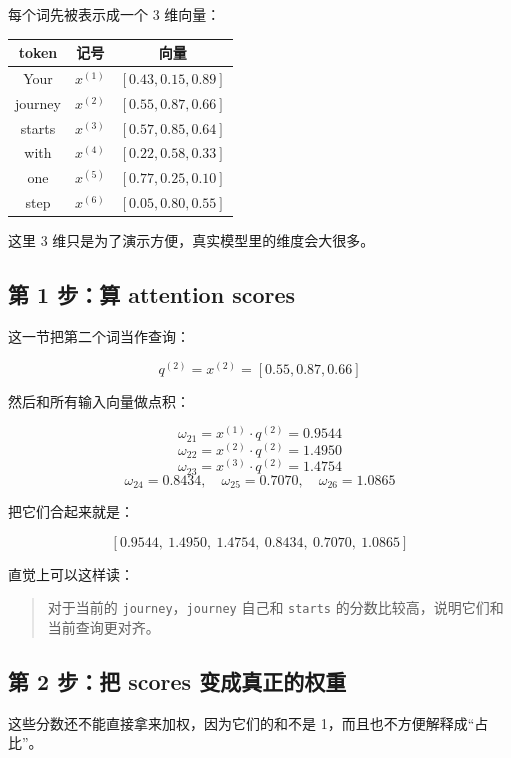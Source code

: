 \documentclass[12pt,a4paper]{ctexart}
\begin{document}
每个词先被表示成一个 3 维向量：

\begin{center}
\begin{tabular}{c c c}
\toprule
token & 记号 & 向量 \\
\midrule
Your & \(x^{(1)}\) & \([0.43, 0.15, 0.89]\) \\
journey & \(x^{(2)}\) & \([0.55, 0.87, 0.66]\) \\
starts & \(x^{(3)}\) & \([0.57, 0.85, 0.64]\) \\
with & \(x^{(4)}\) & \([0.22, 0.58, 0.33]\) \\
one & \(x^{(5)}\) & \([0.77, 0.25, 0.10]\) \\
step & \(x^{(6)}\) & \([0.05, 0.80, 0.55]\) \\
\bottomrule
\end{tabular}
\end{center}

这里 3 维只是为了演示方便，真实模型里的维度会大很多。

\subsection{第 1 步：算 attention scores}

这一节把第二个词当作查询：

\[
q^{(2)} = x^{(2)} = [0.55, 0.87, 0.66]
\]

然后和所有输入向量做点积：

\[
\omega_{21} = x^{(1)} \cdot q^{(2)} = 0.9544
\]
\[
\omega_{22} = x^{(2)} \cdot q^{(2)} = 1.4950
\]
\[
\omega_{23} = x^{(3)} \cdot q^{(2)} = 1.4754
\]
\[
\omega_{24} = 0.8434,\quad
\omega_{25} = 0.7070,\quad
\omega_{26} = 1.0865
\]

把它们合起来就是：

\[
[0.9544,\ 1.4950,\ 1.4754,\ 0.8434,\ 0.7070,\ 1.0865]
\]

直觉上可以这样读：

\begin{quote}
对于当前的 \texttt{journey}，\texttt{journey} 自己和 \texttt{starts} 的分数比较高，说明它们和当前查询更对齐。
\end{quote}

\subsection{第 2 步：把 scores 变成真正的权重}

这些分数还不能直接拿来加权，因为它们的和不是 1，而且也不方便解释成``占比''。
\end{document}
